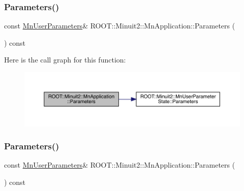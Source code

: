 \subsubsection{\texorpdfstring{Parameters()}{Parameters()}\hspace{0.1cm}{\footnotesize\ttfamily [2/3]}}
{\footnotesize\ttfamily const \mbox{\hyperlink{classROOT_1_1Minuit2_1_1MnUserParameters}{Mn\+User\+Parameters}}\& R\+O\+O\+T\+::\+Minuit2\+::\+Mn\+Application\+::\+Parameters (\begin{DoxyParamCaption}{ }\end{DoxyParamCaption}) const\hspace{0.3cm}{\ttfamily [inline]}}

Here is the call graph for this function\+:
\nopagebreak
\begin{figure}[H]
\begin{center}
\leavevmode
\includegraphics[width=350pt]{df/dd5/classROOT_1_1Minuit2_1_1MnApplication_a8a6af4bd7d2f8af8524bca7a67b2f62d_cgraph}
\end{center}
\end{figure}
\mbox{\label{classROOT_1_1Minuit2_1_1MnApplication_a8a6af4bd7d2f8af8524bca7a67b2f62d}} 
\subsubsection{\texorpdfstring{Parameters()}{Parameters()}\hspace{0.1cm}{\footnotesize\ttfamily [3/3]}}
{\footnotesize\ttfamily const \mbox{\hyperlink{classROOT_1_1Minuit2_1_1MnUserParameters}{Mn\+User\+Parameters}}\& R\+O\+O\+T\+::\+Minuit2\+::\+Mn\+Application\+::\+Parameters (\begin{DoxyParamCaption}{ }\end{DoxyParamCaption}) const\hspace{0.3cm}{\ttfamily [inline]}}

